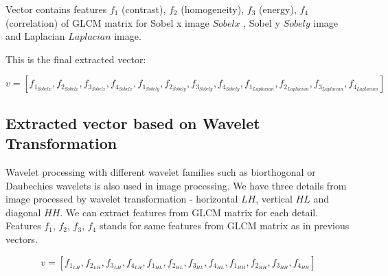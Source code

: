 \documentclass{article}
\begin{document}
Vector contains features $f_1$ (contrast), $f_2$ (homogeneity), $f_3$ (energy), $f_4$ (correlation) of GLCM matrix for Sobel x image $Sobelx$ , Sobel y $Sobely$ image and Laplacian $Laplacian$ image.

This is the final extracted vector:

$$v = [f_1_{Sobelx}, f_2_{Sobelx}, f_3_{Sobelx}, f_4_{Sobelx}, f_1_{Sobely}, f_2_{Sobely}, f_3_{Sobely}, f_4_{Sobely}, f_1_{Laplacian}, f_2_{Laplacian}, f_3_{Laplacian}, f_4_{Laplacian}]$$

\subsection{Extracted vector based on Wavelet Transformation}
Wavelet processing with different wavelet families such as biorthogonal or Daubechies wavelets is also used in image processing. We have three details from image processed by wavelet transformation - horizontal $LH$, vertical $HL$ and diagonal $HH$. We can extract features from GLCM matrix for each detail. Features $f_1$, $f_2$, $f_3$, $f_4$ stands for same features from GLCM matrix as in previous vectors.

$$v = [f_1_{LH}, f_2_{LH}, f_3_{LH}, f_4_{LH}, f_1_{HL}, f_2_{HL}, f_3_{HL}, f_4_{HL}, f_1_{HH}, f_2_{HH}, f_3_{HH}, f_4_{HH}]$$
\end{document}
